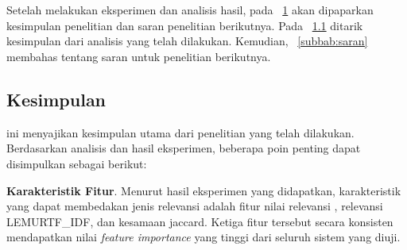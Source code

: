 \chapter{\babEnam}
\label{bab:6}
Setelah melakukan eksperimen dan analisis hasil, pada \bab{}~\ref{bab:6} akan dipaparkan kesimpulan penelitian dan saran penelitian berikutnya. Pada \subbab{}~\ref{subbab:kesimpulan} ditarik kesimpulan dari analisis yang telah dilakukan. Kemudian, \subbab{}~\ref{subbab:saran} membahas tentang saran untuk penelitian berikutnya.





\section{Kesimpulan}
\label{subbab:kesimpulan}
\subbab{} ini menyajikan kesimpulan utama dari penelitian yang telah dilakukan. Berdasarkan analisis dan hasil eksperimen, beberapa poin penting dapat disimpulkan sebagai berikut:

\vspace{2mm}
\noindent\textbf{Karakteristik Fitur}. Menurut hasil eksperimen yang didapatkan, karakteristik yang dapat membedakan jenis relevansi adalah fitur nilai relevansi \obm{}, relevansi LEMURTF\_IDF, dan kesamaan jaccard. Ketiga fitur tersebut secara konsisten mendapatkan nilai \textit{feature importance} yang tinggi dari seluruh sistem yang diuji.

